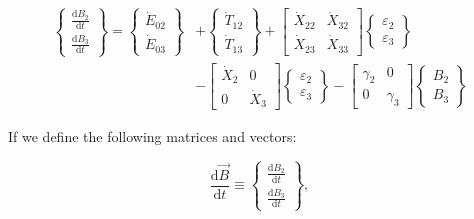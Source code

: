 \begin{equation} \label{eq:C-Expanded_Matrix_Form}
	\begin{split}
		\begin{Bmatrix}
			\frac{\mathrm{d}B_{2}}{\mathrm{d}t} \\[0.4em] %
			\frac{\mathrm{d}B_{3}}{\mathrm{d}t} 
		\end{Bmatrix}
		=
		\begin{Bmatrix}
			\dot{E}_{02}\\
			\dot{E}_{03}
		\end{Bmatrix}
		& +                                               %
		\begin{Bmatrix}
			\dot{T}_{12}\\
			\dot{T}_{13}
		\end{Bmatrix}
		+
		\begin{bmatrix}
			\dot{X}_{22} & \dot{X}_{32}\\
			\dot{X}_{23} & \dot{X}_{33}
		\end{bmatrix}
		\begin{Bmatrix}
			\varepsilon_{2}\\
			\varepsilon_{3}
		\end{Bmatrix} \\                                  %
		& -                                               %
		\begin{bmatrix}
			\dot{X}_{2} & 0          \\
			0           & \dot{X}_{3}
		\end{bmatrix}
		\begin{Bmatrix}
			\varepsilon_{2}\\
			\varepsilon_{3}
		\end{Bmatrix}
		-
		\begin{bmatrix}
			\gamma_{2} & 0          \\
			0          & \gamma_{3}
		\end{bmatrix}
		\begin{Bmatrix}
			B_{2}\\
			B_{3}
		\end{Bmatrix}		
	\end{split}
\end{equation}

\noindent{}If we define the following matrices and vectors:

\begin{equation} \label{eq:dBdt_vec_def}
	\frac{\mathrm{d}\vec{B}}{\mathrm{d}t} 
	\equiv
	\begin{Bmatrix}	
		\frac{\mathrm{d}B_{2}}{\mathrm{d}t}	\\[0.4em] %
		\frac{\mathrm{d}B_{3}}{\mathrm{d}t}
	\end{Bmatrix},
\end{equation}

